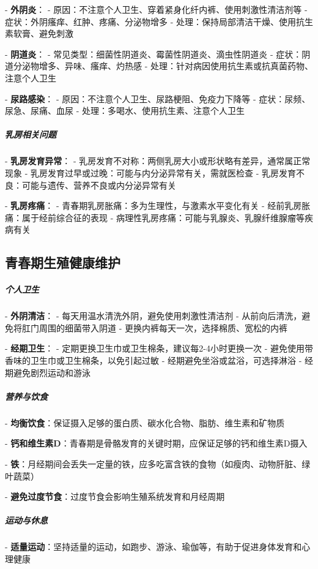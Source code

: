 \begin{enumerate}
- \textbf{外阴炎}：
  - 原因：不注意个人卫生、穿着紧身化纤内裤、使用刺激性清洁剂等
  - 症状：外阴瘙痒、红肿、疼痛、分泌物增多
  - 处理：保持局部清洁干燥、使用抗生素软膏、避免刺激

- \textbf{阴道炎}：
  - 常见类型：细菌性阴道炎、霉菌性阴道炎、滴虫性阴道炎
  - 症状：阴道分泌物增多、异味、瘙痒、灼热感
  - 处理：针对病因使用抗生素或抗真菌药物、注意个人卫生

- \textbf{尿路感染}：
  - 原因：不注意个人卫生、尿路梗阻、免疫力下降等
  - 症状：尿频、尿急、尿痛、血尿
  - 处理：多喝水、使用抗生素、注意个人卫生

\subparagraph{乳房相关问题}

- \textbf{乳房发育异常}：
  - 乳房发育不对称：两侧乳房大小或形状略有差异，通常属正常现象
  - 乳房发育过早或过晚：可能与内分泌异常有关，需就医检查
  - 乳房发育不良：可能与遗传、营养不良或内分泌异常有关

- \textbf{乳房疼痛}：
  - 青春期乳房胀痛：多为生理性，与激素水平变化有关
  - 经前乳房胀痛：属于经前综合征的表现
  - 病理性乳房疼痛：可能与乳腺炎、乳腺纤维腺瘤等疾病有关

\subsection{青春期生殖健康维护}

\subparagraph{个人卫生}

- \textbf{外阴清洁}：
  - 每天用温水清洗外阴，避免使用刺激性清洁剂
  - 从前向后清洗，避免将肛门周围的细菌带入阴道
  - 更换内裤每天一次，选择棉质、宽松的内裤

- \textbf{经期卫生}：
  - 定期更换卫生巾或卫生棉条，建议每2-4小时更换一次
  - 避免使用带香味的卫生巾或卫生棉条，以免引起过敏
  - 经期避免坐浴或盆浴，可选择淋浴
  - 经期避免剧烈运动和游泳

\subparagraph{营养与饮食}

- \textbf{均衡饮食}：保证摄入足够的蛋白质、碳水化合物、脂肪、维生素和矿物质

- \textbf{钙和维生素D}：青春期是骨骼发育的关键时期，应保证足够的钙和维生素D摄入

- \textbf{铁}：月经期间会丢失一定量的铁，应多吃富含铁的食物（如瘦肉、动物肝脏、绿叶蔬菜）

- \textbf{避免过度节食}：过度节食会影响生殖系统发育和月经周期

\subparagraph{运动与休息}

- \textbf{适量运动}：坚持适量的运动，如跑步、游泳、瑜伽等，有助于促进身体发育和心理健康


\end{enumerate}
